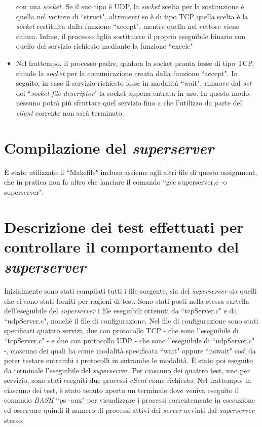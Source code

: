 \documentclass[a4paper, 12pt]{report}
\begin{document}
\begin{itemize}
    con una \textit{socket}. Se il suo tipo è UDP, la \textit{socket} scelta per la sostituzione è quella nel vettore di ``struct", altrimenti se è di tipo TCP
    quella scelta è la \textit{socket} restituita dalla funzione ``accept", mentre quella nel vettore viene chiusa. Infine, il processo figlio sostituisce il proprio
    eseguibile binario con quello del servizio richiesto mediante la funzione ``execle"
    \item Nel frattempo, il processo padre, qualora la socket pronta fosse di tipo TCP, chiude la \textit{socket} per la comunicazione creata dalla funzione ``accept".
    In seguito, in caso il servizio richiesto fosse in modalità ``wait", rimuove dal \textit{set} dei ``\textit{socket file descriptor}" la socket appena entrata in
    uso. In questo modo, nessuno potrà più sfruttare quel servizio fino a che l'utilizzo da parte del \textit{client} corrente non sarà terminato. 
\end{itemize}

\section{Compilazione del \textit{superserver}}

È stato utilizzato il ``Makefile" incluso assieme agli altri file di questo assignment, che in pratica non fa altro che lanciare il comando ``gcc superserver.c
-o superserver".

\section{Descrizione dei test effettuati per controllare il comportamento del \textit{superserver}}

Inizialmente sono stati compilati tutti i file sorgente, sia del \textit{superserver} sia quelli che ci sono stati forniti per ragioni di test.\newline
Sono stati posti nella stessa cartella dell'eseguibile del \textit{superserver} i file eseguibili ottenuti da ``tcpServer.c" e da ``udpServer.c", nonchè il file di
configurazione. Nel file di configurazione sono stati specificati quattro servizi, due con protocollo TCP - che sono l'eseguibile di ``tcpServer.c" - e due con protocollo UDP - che sono l'eseguibile di ``udpServer.c" -, ciascuno dei quali
ha come modalità specificata ``wait" oppure ``nowait" così da poter testare entrambi i protocolli in entrambe le modalità. È stato poi eseguito da terminale l'eseguibile
del \textit{superserver}. Per ciascuno dei quattro test, uno per servizio, sono stati eseguiti due processi \textit{client} come richiesto. Nel frattempo, in ciascuno
dei test, è stato tenuto aperto un terminale dove veniva eseguito il comando \textit{BASH} ``ps -aux" per visualizzare i processi correntemente in esecuzione ed osservare
quindi il numero di processi attivi dei \textit{server} avviati dal \textit{superserver} stesso.
\end{document}
